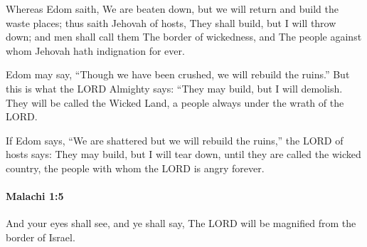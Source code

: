 			\begin{versebox}
					\item[BHS] 
					\item[LXX] 
					\item[ASV] Whereas Edom saith, We are beaten down, but we will return and build the waste places; thus saith Jehovah of hosts, They shall build, but I will throw down; and men shall call them The border of wickedness, and The people against whom Jehovah hath indignation for ever.
					\item[NIV] Edom may say, “Though we have been crushed, we will rebuild the ruins.” But this is what the LORD Almighty says: “They may build, but I will demolish. They will be called the Wicked Land, a people always under the wrath of the LORD.
					\item[NRSV] If Edom says, “We are shattered but we will rebuild the ruins,” the LORD of hosts says: They may build, but I will tear down, until they are called the wicked country, the people with whom the LORD is angry forever.
			\end{versebox}

		\paragraph{Malachi 1:5} %
			\label{MALACHI-1-5}

			And your eyes shall see, and ye shall say, The LORD will be magnified from the border of Israel.

